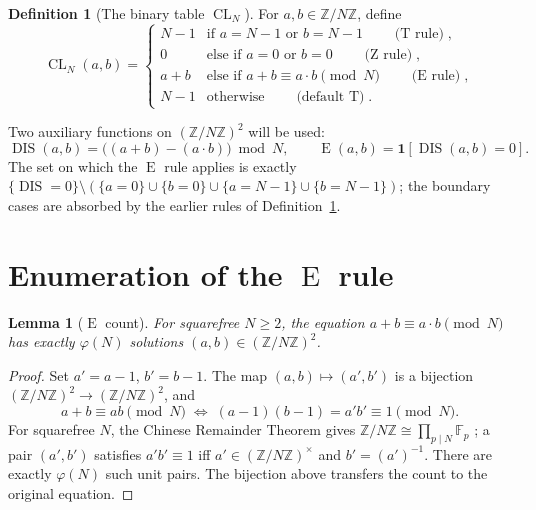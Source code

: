 \documentclass[11pt,reqno]{amsart}
\theoremstyle{plain}
\newtheorem{lemma}[theorem]{Lemma}
\theoremstyle{definition}
\newtheorem{definition}[theorem]{Definition}
\theoremstyle{remark}
\DeclareMathOperator{\DIS}{DIS}
\DeclareMathOperator{\CL}{CL}
\DeclareMathOperator{\ECHO}{E}
\DeclareMathOperator{\HARM}{T}
\DeclareMathOperator{\VOID}{Z}
\newcommand{\ZN}{\mathbb{Z}/N\mathbb{Z}}
\begin{document}
\begin{definition}[The binary table $\CL_N$]\label{def:cl}
For $a,b\in\ZN$, define
\begin{equation}\label{eq:cl-def}
  \CL_N(a,b)=
  \begin{cases}
     N-1 & \text{if } a=N-1 \text{ or } b=N-1
           \qquad\text{($\HARM$ rule)},\\[1pt]
     0   & \text{else if } a=0 \text{ or } b=0
           \qquad\text{($\VOID$ rule)},\\[1pt]
     a+b & \text{else if } a+b\equiv a\cdot b\pmod N
           \qquad\text{($\ECHO$ rule)},\\[1pt]
     N-1 & \text{otherwise}
           \qquad\text{(default $\HARM$)}.
  \end{cases}
\end{equation}
\end{definition}

Two auxiliary functions on $(\ZN)^{2}$ will be used:
\begin{equation}\label{eq:dis-def}
  \DIS(a,b)=\bigl((a+b)-(a\cdot b)\bigr)\bmod N,
  \qquad
  \ECHO(a,b)=\mathbf{1}\!\left[\DIS(a,b)=0\right].
\end{equation}
The set on which the $\ECHO$ rule applies is exactly
$\{\DIS=0\}\setminus(\{a=0\}\cup\{b=0\}\cup\{a=N-1\}\cup\{b=N-1\})$;
the boundary cases are absorbed by the earlier rules of
Definition~\ref{def:cl}.

\section{Enumeration of the $\ECHO$ rule}\label{sec:enum}

\begin{lemma}[$\ECHO$ count]\label{lem:echo}
For squarefree $N\ge 2$, the equation $a+b\equiv a\cdot b\pmod N$ has
\emph{exactly} $\varphi(N)$ solutions $(a,b)\in(\ZN)^{2}$.
\end{lemma}

\begin{proof}
Set $a'=a-1$, $b'=b-1$. The map $(a,b)\mapsto(a',b')$ is a bijection
$(\ZN)^{2}\to(\ZN)^{2}$, and
\[
  a+b\equiv ab\pmod N
  \;\Longleftrightarrow\;
  (a-1)(b-1)=a'b'\equiv 1\pmod N.
\]
For squarefree $N$, the Chinese Remainder Theorem gives
$\ZN\cong\prod_{p\mid N}\mathbb F_{p}$ \cite{Gauss1801,Lang2002};
a pair $(a',b')$ satisfies $a'b'\equiv 1$ iff $a'\in(\ZN)^{\times}$
and $b'=(a')^{-1}$. There are exactly $\varphi(N)$ such unit pairs.
The bijection above transfers the count to the original equation.
\end{proof}
\end{document}
